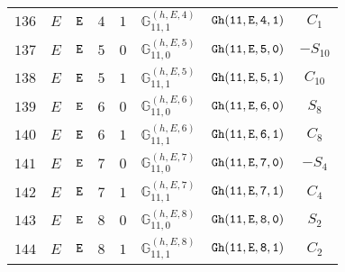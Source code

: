 \documentclass[fleqn,8pt]{jsarticle}
\begin{document}
\begin{table}[ht!]
\begin{center}
\begin{tabular}{cccccccc}
$ 136 $ & $ E $ & $ {\tt E} $ & $ 4 $ & $ 1 $ & $ \mathbb{G}_{11,1}^{(h,E,4)} $ & $ {\tt Gh(11,E,4,1)} $ & $ C_{1} $ \\
$ 137 $ & $ E $ & $ {\tt E} $ & $ 5 $ & $ 0 $ & $ \mathbb{G}_{11,0}^{(h,E,5)} $ & $ {\tt Gh(11,E,5,0)} $ & $ - S_{10} $ \\
$ 138 $ & $ E $ & $ {\tt E} $ & $ 5 $ & $ 1 $ & $ \mathbb{G}_{11,1}^{(h,E,5)} $ & $ {\tt Gh(11,E,5,1)} $ & $ C_{10} $ \\
$ 139 $ & $ E $ & $ {\tt E} $ & $ 6 $ & $ 0 $ & $ \mathbb{G}_{11,0}^{(h,E,6)} $ & $ {\tt Gh(11,E,6,0)} $ & $ S_{8} $ \\
$ 140 $ & $ E $ & $ {\tt E} $ & $ 6 $ & $ 1 $ & $ \mathbb{G}_{11,1}^{(h,E,6)} $ & $ {\tt Gh(11,E,6,1)} $ & $ C_{8} $ \\
$ 141 $ & $ E $ & $ {\tt E} $ & $ 7 $ & $ 0 $ & $ \mathbb{G}_{11,0}^{(h,E,7)} $ & $ {\tt Gh(11,E,7,0)} $ & $ - S_{4} $ \\
$ 142 $ & $ E $ & $ {\tt E} $ & $ 7 $ & $ 1 $ & $ \mathbb{G}_{11,1}^{(h,E,7)} $ & $ {\tt Gh(11,E,7,1)} $ & $ C_{4} $ \\
$ 143 $ & $ E $ & $ {\tt E} $ & $ 8 $ & $ 0 $ & $ \mathbb{G}_{11,0}^{(h,E,8)} $ & $ {\tt Gh(11,E,8,0)} $ & $ S_{2} $ \\
$ 144 $ & $ E $ & $ {\tt E} $ & $ 8 $ & $ 1 $ & $ \mathbb{G}_{11,1}^{(h,E,8)} $ & $ {\tt Gh(11,E,8,1)} $ & $ C_{2} $ \\
 \hline \hline
\end{tabular}
\end{center}
\end{table}
\end{document}
